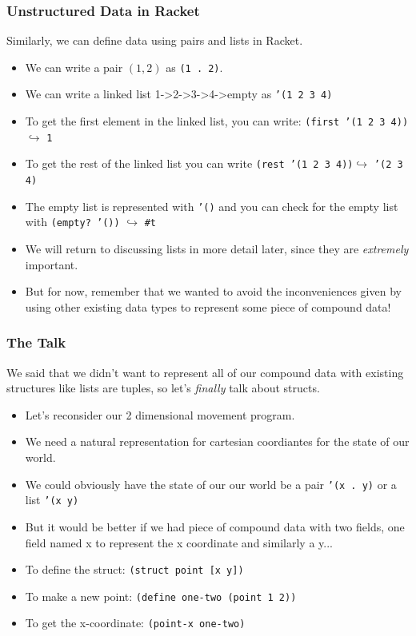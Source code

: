 \documentclass{beamer}
\begin{document}
\begin{frame}
  \frametitle{Unstructured Data in Racket}
  Similarly, we can define data using pairs and lists in Racket.
  \begin{itemize}
  \item<2-> We can write a pair $(1, 2)$ as \texttt{(1 . 2)}.
  \item<3-> We can write a linked list 1->2->3->4->empty as \texttt{'(1 2 3 4)}
  \item<4-> To get the first element in the linked list, you can write:
    \texttt{(first '(1 2 3 4))}$\hookrightarrow$ \texttt{1}
  \item<5-> To get the rest of the linked list you can write
    \texttt{(rest '(1 2 3 4))}$\hookrightarrow$ \texttt{'(2 3 4)}
  \item<6-> The empty list is represented with \texttt{'()}
    and you can check for the empty list with \texttt{(empty? '())}
    $\hookrightarrow$ \texttt{\#t}
  \item<7-> We will return to discussing lists in more detail later,
    since they are \emph{extremely} important.
  \item<8-> But for now, remember that we wanted to avoid the inconveniences
    given by using other existing data types to represent some piece of compound data!
  \end{itemize}
\end{frame}

\begin{frame}
  \frametitle{The Talk}
  We said that we didn't want to represent all of our compound data with
  existing structures like lists are tuples, so
  let's \emph{finally} talk about structs.
  \begin{itemize}
  \item<2-> Let's reconsider our 2 dimensional movement program.
  \item<3-> We need a natural representation for cartesian coordiantes for the state of our world.
  \item<4-> We could obviously have the state of our our world be a pair
    \texttt{'(x . y)} or a list \texttt{'(x  y)}
  \item<5-> But it would be better if we had piece of compound data with two fields, one field named x to represent the x coordinate and similarly a y...
  \item<6-> To define the struct: \texttt{(struct point [x y])}
  \item<7-> To make a new point: \texttt{(define one-two (point 1 2))}
  \item<8-> To get the x-coordinate: \texttt{(point-x one-two)}
  \end{itemize}
\end{frame}
\end{document}
